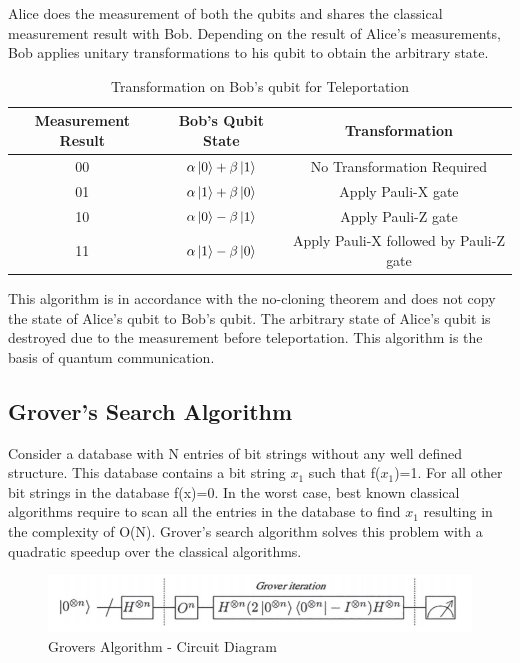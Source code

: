 \documentclass[english,a4paper,11pt,oneside,onecolumn]{book}
\begin{document}
Alice does the measurement of both the qubits and shares the classical measurement result with Bob. Depending on the result of Alice's measurements, Bob applies unitary transformations to his qubit to obtain the arbitrary state.

\begin{table}[!h]
\begin{center}
\begin{tabular}{|c|c|c|}
\hline
\textbf{Measurement Result} & \textbf{Bob's Qubit State} & \textbf{Transformation} \\
\hline
00 & \(\alpha\ket{0}+\beta\ket{1}\) & No Transformation Required\\
\hline
01 & \(\alpha\ket{1}+\beta\ket{0}\) & Apply Pauli-X gate \\
\hline
10 & \(\alpha\ket{0}-\beta\ket{1}\) & Apply Pauli-Z gate \\
\hline
11 & \(\alpha\ket{1}-\beta\ket{0}\) & Apply Pauli-X followed by Pauli-Z gate\\
\hline
\end{tabular}
\end{center}
\caption{Transformation on Bob's qubit for Teleportation} 
\label{tab:qTelePort}
\end{table}

This algorithm is in accordance with the no-cloning theorem and does not copy the state of Alice's qubit to Bob's qubit. The arbitrary state of Alice's qubit is destroyed due to the measurement before teleportation. This algorithm is the basis of quantum communication.

\subsection{Grover's Search Algorithm}
\label{sec:groverAlgo}
Consider a database with N entries of bit strings without any well defined structure. This database contains a bit string \(x_1\) such that f(\(x_1\))=1. For all other bit strings in the database f(x)=0. In the worst case, best known classical algorithms require to scan all the entries in the database to find \(x_1\) resulting in the complexity of O(N). Grover's search algorithm solves this problem with a quadratic speedup over the classical algorithms.\\

\begin{figure}[H]
    \centering
    \includegraphics[scale=0.7]{Images/GroversCircuit.png}
    \caption{Grovers Algorithm - Circuit Diagram}
    \label{fig:groverCircuit}
\end{figure}
\end{document}
